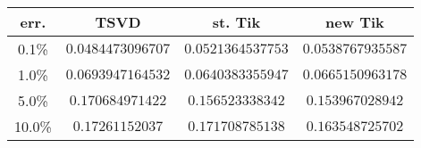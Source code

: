 \begin{tabular} { c | c | c | c }
err. & TSVD & st. Tik & new Tik \\ \hline 
0.1\% & $0.0484473096707$ & $0.0521364537753$ & $0.0538767935587$ \\
1.0\% & $0.0693947164532$ & $0.0640383355947$ & $0.0665150963178$ \\
5.0\% & $0.170684971422$ & $0.156523338342$ & $0.153967028942$ \\
10.0\% & $0.17261152037$ & $0.171708785138$ & $0.163548725702$ \\
\end{tabular}
